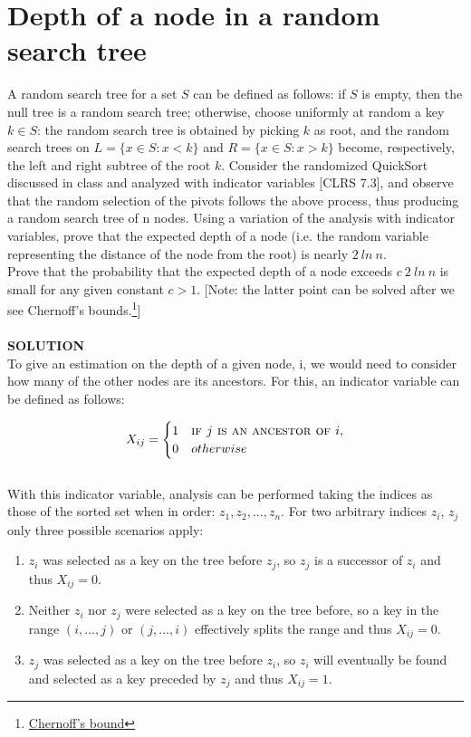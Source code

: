 \documentclass[a4paper]{article}
\begin{document}
\section*{Depth of a node in a random search tree}
A random search tree for a set $S$ can be defined as follows: if $S$ is empty, then the null tree is a random search tree; otherwise, choose uniformly at random a key $k \in S$: the random search tree is obtained by picking $k$ as root, and the random search trees on $L = \{x \in S : x < k\}$ and $R = \{x \in S :x > k\}$ become, respectively, the left and right subtree of the root $k$. Consider the randomized QuickSort discussed in class and analyzed with indicator variables [CLRS 7.3], and observe that the random selection of the pivots follows the above process, thus producing a random search tree of n nodes. Using a variation of the analysis with indicator variables, prove that the expected depth of a node (i.e. the random variable representing the distance of the node from the root) is nearly $2\ ln \ n$. \\ Prove that the probability that the expected depth of a node exceeds $c \ 2 \ ln\ n$ is small for any given constant $c > 1$. [Note: the latter point can be solved after we see Chernoff’s bounds.\footnote{\href{http://math.mit.edu/~goemans/18310S15/chernoff-notes.pdf}{Chernoff's bound}}]\\
\\
\textbf{SOLUTION}
\\
To give an estimation on the depth of a given node, i, we would need to
consider how many of the other nodes are its ancestors. For this, an
indicator variable can be defined as follows:

\[X_{ij} = 
\begin{cases}
1 & \textsc{if } j \textsc{ is an ancestor of } i,\cr
0 & otherwise
\end{cases}
\]
\qquad \\
With this indicator variable, analysis can be performed taking the
indices as those of the sorted set when in order:
\(z_1, z_2, ..., z_n\). For two arbitrary indices \(z_i\), \(z_j\) only
three possible scenarios apply:

\begin{enumerate}
\def\labelenumi{\arabic{enumi}.}
\item
  \(z_i\) was selected as a key on the tree before \(z_j\), so \(z_j\)
  is a successor of \(z_i\) and thus \(X_{ij} = 0\).
\item
  Neither \(z_i\) nor \(z_j\) were selected as a key on the tree before,
  so a key in the range \((i, ..., j)\) or \((j, ..., i)\) effectively
  splits the range and thus \(X_{ij} = 0\).
\item
  \(z_j\) was selected as a key on the tree before \(z_i\), so \(z_i\)
  will eventually be found and selected as a key preceded by \(z_j\) and
  thus \(X_{ij} = 1\).
\end{enumerate}
\end{document}
